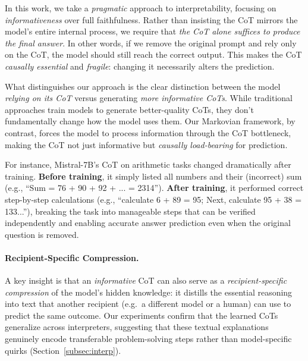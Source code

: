 \documentclass{article}
\begin{document}
In this work, we take a \emph{pragmatic} approach to interpretability, focusing on \emph{informativeness} over full faithfulness. Rather than insisting the CoT mirrors the model's entire internal process, we require that \emph{the CoT alone suffices to produce the final answer}. In other words, if we remove the original prompt and rely only on the CoT, the model should still reach the correct output. This makes the CoT \emph{causally essential} and \emph{fragile}: changing it necessarily alters the prediction.

What distinguishes our approach is the clear distinction between the model \emph{relying on its CoT} versus generating \emph{more informative CoTs}. While traditional approaches train models to generate better-quality CoTs, they don't fundamentally change how the model uses them. Our Markovian framework, by contrast, forces the model to process information through the CoT bottleneck, making the CoT not just informative but \emph{causally load-bearing} for prediction.

For instance, Mistral-7B's CoT on arithmetic tasks changed dramatically after training. \textbf{Before training}, it simply listed all numbers and their (incorrect) sum (e.g., ``Sum = 76 + 90 + 92 + ... = 2314''). \textbf{After training}, it performed correct step-by-step calculations (e.g., ``calculate 6 + 89 = 95; Next, calculate 95 + 38 = 133...''), breaking the task into manageable steps that can be verified independently and enabling accurate answer prediction even when the original question is removed.

\paragraph{Recipient-Specific Compression.}
A key insight is that an \emph{informative} CoT can also serve as a \emph{recipient-specific compression} of the model's hidden knowledge: it distills the essential reasoning into text that another recipient (e.g.\ a different model or a human) can use to predict the same outcome. Our experiments confirm that the learned CoTs generalize across interpreters, suggesting that these textual explanations genuinely encode transferable problem-solving steps rather than model-specific quirks (Section~\ref{subsec:interp}).
\end{document}
